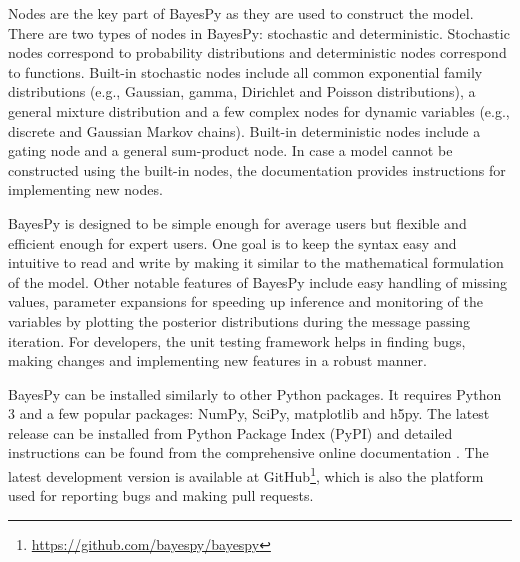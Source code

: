 \documentclass[twoside,11pt]{article}
\begin{document}
Nodes are the key part of BayesPy as they are used to construct the model.
There are two types of nodes in BayesPy: stochastic and deterministic.
Stochastic nodes correspond to probability distributions and deterministic nodes
correspond to functions.  Built-in stochastic nodes include all common
exponential family distributions (e.g., Gaussian, gamma, Dirichlet and Poisson
distributions), a general mixture distribution and a few complex nodes for
dynamic variables (e.g., discrete and Gaussian Markov chains).  Built-in
deterministic nodes include a gating node and a general sum-product node.  In
case a model cannot be constructed using the built-in nodes, the documentation
provides instructions for implementing new nodes.



BayesPy is designed to be simple enough for average users but flexible and
efficient enough for expert users.  One goal is to keep the syntax easy and
intuitive to read and write by making it similar to the mathematical formulation
of the model.  Other notable features of BayesPy include easy handling of
missing values, parameter expansions \citep{Qi:2007} for speeding up inference
and monitoring of the variables by plotting the posterior distributions during
the message passing iteration.  For developers, the unit testing framework helps
in finding bugs, making changes and implementing new features in a robust
manner.



BayesPy can be installed similarly to other Python packages.  It requires Python
3 and a few popular packages: NumPy, SciPy, matplotlib and h5py.  The latest
release can be installed from Python Package Index (PyPI) and detailed
instructions can be found from the comprehensive online documentation
\citep{bayespy.org}.  The latest development version is available at
GitHub\footnote{\url{https://github.com/bayespy/bayespy}}, which is also the
platform used for reporting bugs and making pull requests.











\end{document}
